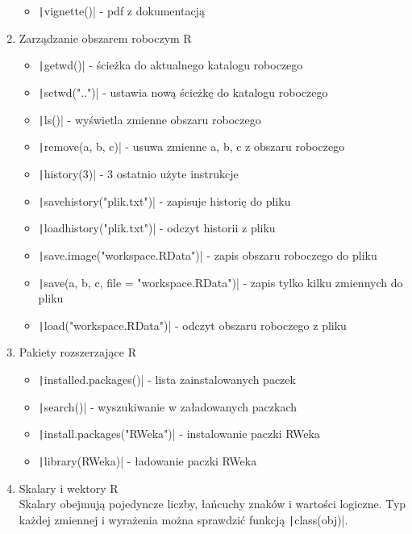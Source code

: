 \documentclass[11pt]{article}
\begin{document}
\begin{enumerate}
\begin{itemize}
        	\item \texttt|vignette()| - pdf z dokumentacją
        \end{itemize}
        \item Zarządzanie obszarem roboczym R
        \begin{itemize}
        	\item \texttt|getwd()| - ścieżka do aktualnego katalogu roboczego
        	\item \texttt|setwd("..")| - ustawia nową ścieżkę do katalogu roboczego
        	\item \texttt|ls()| - wyświetla zmienne obszaru roboczego
        	\item \texttt|remove(a, b, c)| - usuwa zmienne a, b, c z obszaru roboczego
        	\item \texttt|history(3)| - 3 ostatnio użyte instrukcje
        	\item \texttt|savehistory("plik.txt")| - zapisuje historię do pliku
        	\item \texttt|loadhistory("plik.txt")| - odczyt historii z pliku
        	\item \texttt|save.image("workspace.RData")| - zapis obszaru roboczego do pliku
        	\item \texttt|save(a, b, c, file = "workspace.RData")| - zapis tylko kilku zmiennych do pliku
        	\item \texttt|load("workspace.RData")| - odczyt obszaru roboczego z pliku
        \end{itemize}
        \item Pakiety rozszerzające R
        \begin{itemize}
        	\item \texttt|installed.packages()| - lista zainstalowanych paczek
        	\item \texttt|search()| - wyszukiwanie w załadowanych paczkach
        	\item \texttt|install.packages("RWeka")| - instalowanie paczki RWeka
        	\item \texttt|library(RWeka)| - ładowanie paczki RWeka
        \end{itemize}
        \item Skalary i wektory R \\
        Skalary obejmują pojedyncze liczby, łańcuchy znaków i wartości logiczne.
        Typ każdej zmiennej i wyrażenia można sprawdzić funkcją \texttt|class(obj)|.

\end{enumerate}
\end{document}
